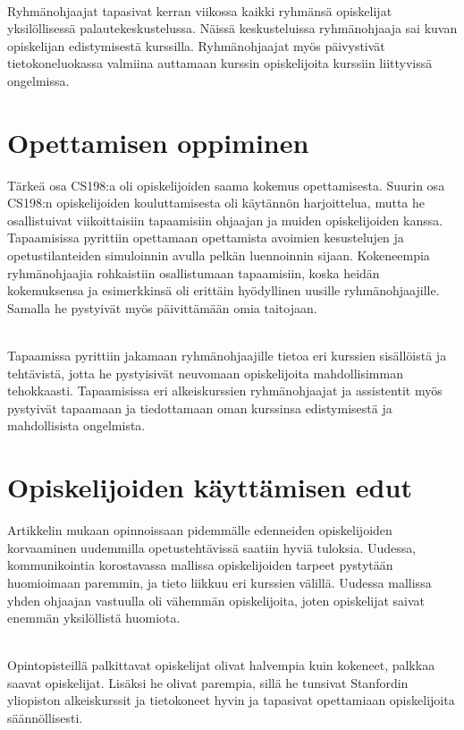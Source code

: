 \documentclass[finnish]{tktltiki2}
\theoremstyle{definition}
\theoremstyle{remark}
\begin{document}
\\

Ryhmänohjaajat tapasivat kerran viikossa kaikki ryhmänsä opiskelijat yksilöllisessä palautekeskustelussa. Näissä keskusteluissa ryhmänohjaaja sai kuvan opiskelijan edistymisestä kurssilla. Ryhmänohjaajat myös päivystivät tietokoneluokassa valmiina auttamaan kurssin opiskelijoita kurssiin liittyvissä ongelmissa.





\section{Opettamisen oppiminen}

Tärkeä osa CS198:a oli opiskelijoiden saama kokemus opettamisesta. Suurin osa CS198:n opiskelijoiden kouluttamisesta oli käytännön harjoittelua, mutta he osallistuivat viikoittaisiin tapaamisiin ohjaajan ja muiden opiskelijoiden kanssa. Tapaamisissa pyrittiin opettamaan opettamista avoimien kesustelujen ja opetustilanteiden simuloinnin avulla pelkän luennoinnin sijaan. Kokeneempia ryhmänohjaajia rohkaistiin osallistumaan tapaamisiin, koska heidän kokemuksensa ja esimerkkinsä oli erittäin hyödyllinen uusille ryhmänohjaajille. Samalla he pystyivät myös päivittämään omia taitojaan. 

\\

Tapaamissa pyrittiin jakamaan ryhmänohjaajille tietoa eri kurssien sisällöistä ja tehtävistä, jotta he pystyisivät neuvomaan opiskelijoita mahdollisimman tehokkaasti. Tapaamisissa eri alkeiskurssien ryhmänohjaajat ja assistentit myös pystyivät tapaamaan ja tiedottamaan oman kurssinsa edistymisestä ja mahdollisista ongelmista.


\section{Opiskelijoiden käyttämisen edut}

Artikkelin mukaan opinnoissaan pidemmälle edenneiden opiskelijoiden korvaaminen uudemmilla opetustehtävissä saatiin hyviä tuloksia. Uudessa, kommunikointia korostavassa mallissa opiskelijoiden tarpeet pystytään huomioimaan paremmin, ja tieto liikkuu eri kurssien välillä. Uudessa mallissa yhden ohjaajan vastuulla oli vähemmän opiskelijoita, joten opiskelijat saivat enemmän yksilöllistä huomiota.

\\

Opintopisteillä palkittavat opiskelijat olivat halvempia kuin kokeneet, palkkaa saavat opiskelijat. Lisäksi he olivat parempia, sillä he tunsivat Stanfordin yliopiston alkeiskurssit ja tietokoneet hyvin ja tapasivat opettamiaan opiskelijoita säännöllisesti.






\end{document}
